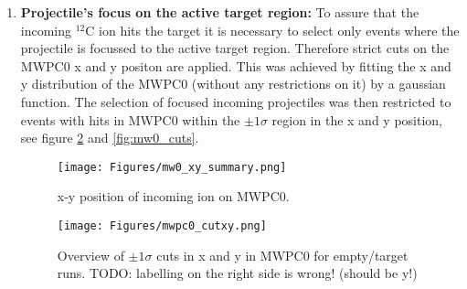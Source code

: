 \begin{enumerate}
\begin{table}[h!]
\label{tab:tpats}
\end{table}
Since the TPat selection itself does not necessary set any pileup constraints it is important to analyse the signals of the detectors upstream carefully to insure yourself that only events with  one incoming $^{12}$C ion at a time get selected. Herefore events with incoming ions with charge $Z = 6 \pm 1\sigma$ are chosen, as discussed in the previous point. Moreover it is required that both left and right preamplifiers of the start detector have seen a coincident signal within a time-window of 1.391 ns.---TODO: why this time window?-- The overall searching window of the start detector was set to 2 $\mu s$, see figure \ref{fig:start_good_event_sel}. For the MWPC0 which is mounted right at the beam entrance of Cave C no hit multiplicity cuts were applied considering its operating mode, which is designed for charge sharing between the readout pads. 
\begin{figure}
\centering
\texttt{[image: Figures/start\_tdiff\_exactly2good\_hits.png]}
\caption{$\Delta t_{right-left}$ between hits in the Start detector for events with exactly one hit on the left and right preamplifier and limiting the time differnce in the range 0.555 ns to 1.946ns.}
\label{fig:start_good_event_sel}
\end{figure}
\item \textbf{Projectile's focus on the active target region:}\newline
To assure that the incoming $^{12}$C ion hits the target it is necessary to select only events where the projectile is focussed to the active target region. Therefore strict cuts on the MWPC0 x and y positon are applied. This was achieved by fitting the x and y distribution of the MWPC0 (without any restrictions on it) by a gaussian function. The selection of focused incoming projectiles was then restricted to events with hits in MWPC0 within the $\pm 1\sigma$ region in the x and y position, see figure \ref{fig:mw0_xy_overview} and \ref{fig:mw0_cuts}.\newline
\begin{figure}
\centering
\texttt{[image: Figures/mw0\_xy\_summary.png]}
\caption{x-y position of incoming ion on MWPC0.}
\label{fig:mw0_xy_overview}
\end{figure}
\begin{figure}
\centering
\texttt{[image: Figures/mwpc0\_cutxy.png]}
\caption{Overview of $\pm 1\sigma$ cuts in x and y in MWPC0 for empty/target runs. TODO: labelling on the right side is wrong! (should be y!)}

\end{figure}
\end{enumerate}
